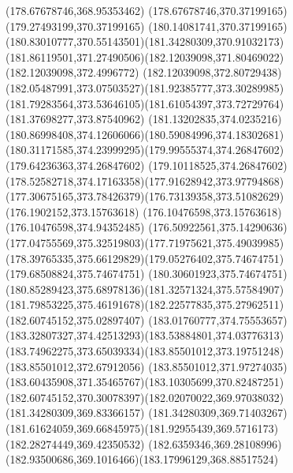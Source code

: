 \documentclass{article}
\begin{document}
{{\lineto(178.67678746,368.95353462)
\lineto(178.67678746,370.37199165)
\lineto(179.27493199,370.37199165)
\curveto(180.14081741,370.37199165)(180.83010777,370.55143501)(181.34280309,370.91032173)
\curveto(181.86119501,371.27490506)(182.12039098,371.80469022)(182.12039098,372.4996772)
\curveto(182.12039098,372.80729438)(182.05487991,373.07503527)(181.92385777,373.30289985)
\curveto(181.79283564,373.53646105)(181.61054397,373.72729764)(181.37698277,373.87540962)
\curveto(181.13202835,374.0235216)(180.86998408,374.12606066)(180.59084996,374.18302681)
\curveto(180.31171585,374.23999295)(179.99555374,374.26847602)(179.64236363,374.26847602)
\curveto(179.10118525,374.26847602)(178.52582718,374.17163358)(177.91628942,373.97794868)
\curveto(177.30675165,373.78426379)(176.73139358,373.51082629)(176.1902152,373.15763618)
\lineto(176.10476598,373.15763618)
\lineto(176.10476598,374.94352485)
\curveto(176.50922561,375.14290636)(177.04755569,375.32519803)(177.71975621,375.49039985)
\curveto(178.39765335,375.66129829)(179.05276402,375.74674751)(179.68508824,375.74674751)
\curveto(180.30601923,375.74674751)(180.85289423,375.68978136)(181.32571324,375.57584907)
\curveto(181.79853225,375.46191678)(182.22577835,375.27962511)(182.60745152,375.02897407)
\curveto(183.01760777,374.75553657)(183.32807327,374.42513293)(183.53884801,374.03776313)
\curveto(183.74962275,373.65039334)(183.85501012,373.19751248)(183.85501012,372.67912056)
\curveto(183.85501012,371.97274035)(183.60435908,371.35465767)(183.10305699,370.82487251)
\curveto(182.60745152,370.30078397)(182.02070022,369.97038032)(181.34280309,369.83366157)
\lineto(181.34280309,369.71403267)
\curveto(181.61624059,369.66845975)(181.92955439,369.5716173)(182.28274449,369.42350532)
\curveto(182.6359346,369.28108996)(182.93500686,369.1016466)(183.17996129,368.88517524)
\closepath
}
}
{
}
{
}
{
}
\end{document}

